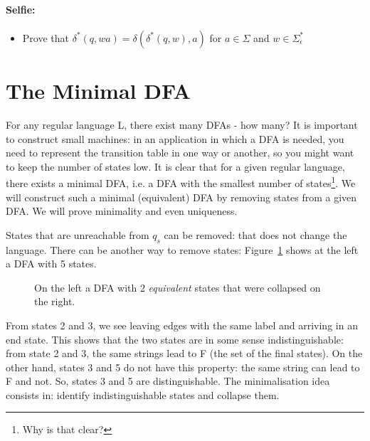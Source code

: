 \paragraph{Selfie:}
\begin{itemize}
\item[]
Prove that $\delta^*(q,wa) = \delta(\delta^*(q,w),a)$ for $a \in
\Sigma$ and $w \in \Sigma_{\epsilon}^*$
\end{itemize}


\section{The Minimal DFA}\label{minfsa}

For any regular language L, there exist many DFAs - how many? It is
important to construct small machines: in an application in which a
DFA is needed, you need to represent the transition table in one way
or another, so you might want to keep the number of states low. It is
clear that for a given regular language, there exists a minimal DFA,
i.e. a DFA with the smallest number of states\footnote{Why is that
clear?}. We will construct such a minimal (equivalent) DFA by removing
states from a given DFA. We will prove minimality and even uniqueness.

States that are unreachable from $q_s$ can be removed: that does not
change the language. There can be another way to remove states:
Figure~\ref{mini1} shows at the left a DFA with 5 states.

\begin{figure}[h]
\caption{ On the left a DFA with 2 {\em equivalent} states that were
collapsed on the right.\label{mini1}}
\end{figure}

From states 2 and 3, we see leaving edges with the same label and
arriving in an end state. This shows that the two states are in some
sense indistinguishable: from state 2 and 3, the same strings lead to
F (the set of the final states). On the other hand, states 3 and 5 do not have this property: the
same string can lead to F and not. So, states 3 and 5 are
distinguishable. The minimalisation idea consists in: identify
indistinguishable states and collapse them.

